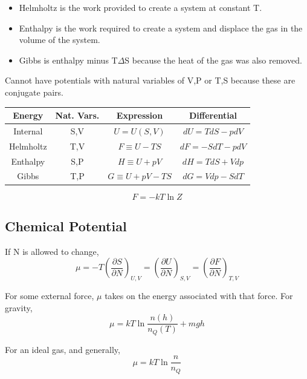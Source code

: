 \documentclass[11pt]{article}
\begin{document}
\begin{itemize}
    \item Helmholtz is the work provided to create a system at constant T.
    \item Enthalpy is the work required to create a system and displace the gas in the volume of the system.
    \item Gibbs is enthalpy minus T$\Delta$S because the heat of the gas was also removed.
\end{itemize}

Cannot have potentials with natural variables of V,P or T,S because these are conjugate pairs.
\begin{center}
\begin{tabular}{c|c|c|c}
    {\bf Energy} & {\bf Nat. Vars.} & {\bf Expression} & {\bf Differential} \\ \hline
    Internal & S,V & $U = U(S, V)$ & $dU = TdS - pdV$ \\
    Helmholtz & T,V & $F \equiv U - TS$ & $dF = -SdT - pdV$ \\
    Enthalpy & S,P & $H \equiv U + pV$ & $dH = TdS + Vdp$ \\
    Gibbs & T,P & $G \equiv U + pV - TS$ & $dG = Vdp - SdT$
\end{tabular}
\end{center}

\begin{equation}
    F = - kT \ln{Z}
\end{equation}

\subsection{Chemical Potential}
If N is allowed to change,
\begin{equation}
    \mu = 
    -T \left( \frac{\partial S}{\partial N} \right)_{U,V} = 
    \left( \frac{\partial U}{\partial N} \right)_{S,V} = 
    \left( \frac{\partial F}{\partial N} \right)_{T,V}
\end{equation}

For some external force, $\mu$ takes on the energy associated with that force. For gravity,
\begin{equation}
    \mu = kT \ln{\frac{n(h)}{n_Q(T)}} + mgh
\end{equation}

For an ideal gas, and generally,
\begin{equation}
    \mu = kT \ln{\frac{n}{n_Q}}
\end{equation}
\end{document}
